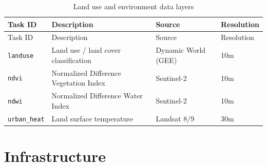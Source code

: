 \documentclass[
  letterpaper,
  DIV=11,
  numbers=noendperiod]{scrreprt}
\begin{document}
\begin{longtable}[]{@{}
  >{\raggedright\arraybackslash}p{}
  >{\raggedright\arraybackslash}p{}
  >{\raggedright\arraybackslash}p{}
  >{\raggedright\arraybackslash}p{}@{}}
\caption{Land use and environment data
layers}\label{tbl-environment}\tabularnewline
\toprule\noalign{}
\begin{minipage}[b]{\linewidth}\raggedright
Task ID
\end{minipage} & \begin{minipage}[b]{\linewidth}\raggedright
Description
\end{minipage} & \begin{minipage}[b]{\linewidth}\raggedright
Source
\end{minipage} & \begin{minipage}[b]{\linewidth}\raggedright
Resolution
\end{minipage} \\
\midrule\noalign{}
\endfirsthead
\toprule\noalign{}
\begin{minipage}[b]{\linewidth}\raggedright
Task ID
\end{minipage} & \begin{minipage}[b]{\linewidth}\raggedright
Description
\end{minipage} & \begin{minipage}[b]{\linewidth}\raggedright
Source
\end{minipage} & \begin{minipage}[b]{\linewidth}\raggedright
Resolution
\end{minipage} \\
\midrule\noalign{}
\endhead
\bottomrule\noalign{}
\endlastfoot
\texttt{landuse} & Land use / land cover classification & Dynamic World
(GEE) & 10m \\
\texttt{ndvi} & Normalized Difference Vegetation Index & Sentinel-2 &
10m \\
\texttt{ndwi} & Normalized Difference Water Index & Sentinel-2 & 10m \\
\texttt{urban\_heat} & Land surface temperature & Landsat 8/9 & 30m \\
\end{longtable}

\section{Infrastructure}\label{infrastructure}
\end{document}
